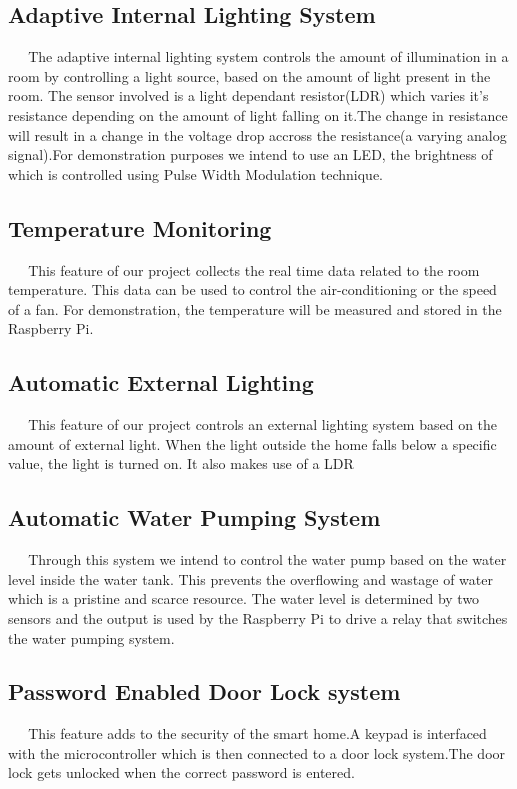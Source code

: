 \documentclass[12pt,a4paper,oneside]{report}
\begin{document}
\begin{onehalfspacing}
\newpage



\subsection{Adaptive Internal Lighting System}
{$\;\;\;\;$}
The adaptive internal lighting system controls the amount of illumination in a room by controlling a light source, based on the amount of light present in the room. The sensor involved is a light dependant resistor(LDR) which varies it's resistance depending on the amount of light falling on it.The change in resistance will result in a change in the voltage drop accross the resistance(a varying analog signal).For demonstration purposes we intend to use an LED, the brightness of which is controlled using Pulse Width Modulation technique. 

\subsection{Temperature Monitoring}
{$\;\;\;\;$}
 This feature of our project collects the real time data related to the room temperature. This data can be used to control the air-conditioning or the speed of a fan. For demonstration, the temperature will be measured and stored in the Raspberry Pi.

\subsection{Automatic External Lighting}
{$\;\;\;\;$}
This feature of our project controls an external lighting system based on the amount of external light. When the light outside the home falls below a specific value, the light is turned on. It also makes use of a LDR

\subsection{Automatic Water Pumping System}
{$\;\;\;\;$}
 Through this system we intend to control the water pump based on the water level inside the water tank. This prevents the overflowing and wastage of water which is a pristine and scarce resource. The water level is determined by two sensors and the output is used by the Raspberry Pi to drive a relay that switches the water pumping system.

\newpage
\subsection{Password Enabled Door Lock system}
{$\;\;\;\;$}
This feature adds to the security of the smart home.A keypad is interfaced with the microcontroller which is then connected to a door lock system.The door lock gets unlocked when the correct password is entered.


\end{onehalfspacing}
\end{document}
